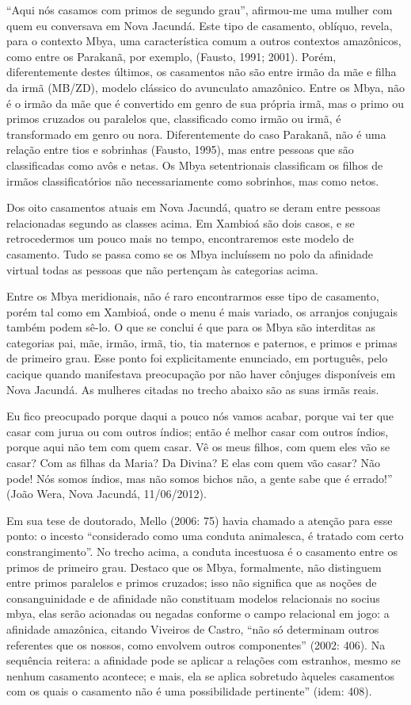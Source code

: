 ``Aqui nós casamos com primos de segundo grau'', afirmou-me uma mulher com
quem eu conversava em Nova Jacundá. Este tipo de casamento, oblíquo,
revela, para o contexto Mbya, uma característica comum a outros
contextos amazônicos, como entre os Parakanã, por exemplo, (Fausto,
1991; 2001). Porém, diferentemente destes últimos, os casamentos não
são entre irmão da mãe e filha da irmã (MB/ZD), modelo clássico do
avunculato amazônico. Entre os Mbya, não é o irmão da mãe que é
convertido em genro de sua própria irmã, mas o primo ou primos cruzados
ou paralelos que, classificado como irmão ou irmã, é transformado em
genro ou nora. Diferentemente do caso Parakanã, não é uma relação entre
tios e sobrinhas (Fausto, 1995), mas entre pessoas que são
classificadas como avôs e netas. Os Mbya setentrionais classificam os
filhos de irmãos classificatórios não necessariamente como sobrinhos,
mas como netos.

Dos oito casamentos atuais em Nova Jacundá, quatro se deram entre
pessoas relacionadas segundo as classes acima. Em Xambioá são dois
casos, e se retrocedermos um pouco mais no tempo, encontraremos este
modelo de casamento. Tudo se passa como se os Mbya incluíssem no polo
da afinidade virtual todas as pessoas que não pertençam às categorias
acima.

Entre os Mbya meridionais, não é raro encontrarmos esse tipo de
casamento, porém tal como em Xambioá, onde o menu é mais variado, os
arranjos conjugais também podem sê-lo. O que se conclui é que para os
Mbya são interditas as categorias pai, mãe, irmão, irmã, tio, tia
maternos e paternos, e primos e primas de primeiro grau. Esse ponto foi
explicitamente enunciado, em português, pelo cacique quando manifestava
preocupação por não haver cônjuges disponíveis em Nova Jacundá. As
mulheres citadas no trecho abaixo são as suas irmãs reais.

Eu fico preocupado porque daqui a pouco nós vamos acabar, porque vai ter
que casar com jurua ou com outros índios; então é melhor casar com
outros índios, porque aqui não tem com quem casar. Vê os meus filhos,
com quem eles vão se casar? Com as filhas da Maria? Da Divina? E elas
com quem vão casar? Não pode! Nós somos índios, mas não somos bichos
não, a gente sabe que é errado!'' (João Wera, Nova Jacundá, 11/06/2012).

Em sua tese de doutorado, Mello (2006: 75) havia chamado a atenção para
esse ponto: o incesto ``considerado como uma conduta animalesca, é
tratado com certo constrangimento''. No trecho acima, a conduta
incestuosa é o casamento entre os primos de primeiro grau. Destaco que
os Mbya, formalmente, não distinguem entre primos paralelos e primos
cruzados; isso não significa que as noções de consanguinidade e de
afinidade não constituam modelos relacionais no socius mbya, elas serão
acionadas ou negadas conforme o campo relacional em jogo: a afinidade
amazônica, citando Viveiros de Castro, ``não só determinam outros
referentes que os nossos, como envolvem outros componentes'' (2002: 406).
Na sequência reitera: a afinidade pode se aplicar a relações com
estranhos, mesmo se nenhum casamento acontece; e mais, ela se aplica
sobretudo àqueles casamentos com os quais o casamento não é uma
possibilidade pertinente'' (idem: 408).


